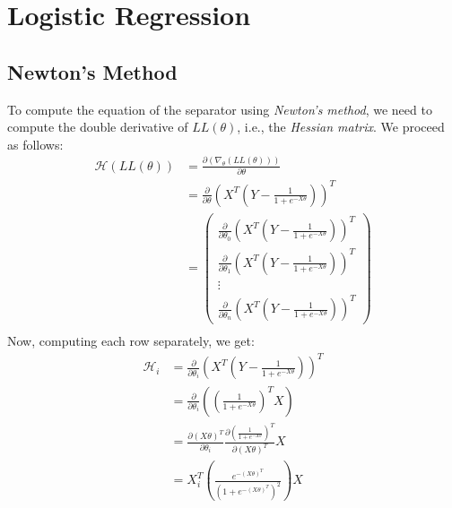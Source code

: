 \documentclass[11pt]{article}
\begin{document}
\section{Logistic Regression}

\subsection{Newton's Method}
To compute the equation of the separator using \textit{Newton's method}, we need to compute the double derivative of $LL(\theta)$, i.e., the \textit{Hessian matrix}. We proceed as follows:
\begin{equation}
    \begin{split}
        \mathcal{H}(LL(\theta)) &= \frac{\partial\left(\nabla_\theta(LL(\theta))\right)}{\partial\theta}\\
        &= \frac{\partial}{\partial\theta}{\left(X^T\left(Y - \frac{1}{1+e^{-X\theta}}\right)\right)}^T\\
        &=
        \begin{pmatrix}
            \frac{\partial}{\partial\theta_0}{\left(X^T\left(Y - \frac{1}{1+e^{-X\theta}}\right)\right)}^T\\
            \frac{\partial}{\partial\theta_1}{\left(X^T\left(Y - \frac{1}{1+e^{-X\theta}}\right)\right)}^T\\
            \vdots\\
            \frac{\partial}{\partial\theta_n}{\left(X^T\left(Y - \frac{1}{1+e^{-X\theta}}\right)\right)}^T
        \end{pmatrix}\\
    \end{split}
\end{equation}
Now, computing each row separately, we get:
\begin{equation}
    \begin{split}
        \mathcal{H}_i &= \frac{\partial}{\partial\theta_i}{\left(X^T\left(Y - \frac{1}{1+e^{-X\theta}}\right)\right)}^T\\
        &= \frac{\partial}{\partial\theta_i}\left(\left(\frac{1}{1+e^{-X\theta}}\right)^T X\right)\\ %
        &= \frac{\partial(X\theta)^T}{\partial\theta_i}\frac{\partial\left(\frac{1}{1+e^{-X\theta}}\right)^T}{\partial(X\theta)^T} X\\ %
        &= X_i^T \left(\frac{e^{-(X\theta)^T}}{\left(1+e^{-(X\theta)^T}\right)^2}\right) X %
    \end{split}
\end{equation}
\end{document}
